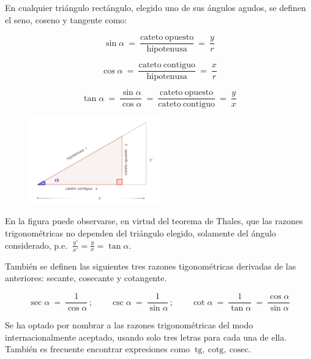 \begin{definition}

En cualquier triángulo rectángulo, elegido uno de sus ángulos agudos, se definen el seno, coseno y tangente como:

\begin{multicols}{2}

$$\sin \alpha \ = \ \dfrac{\mathrm{cateto \ opuesto}}{\mathrm{hipotenusa}} \ = \ \dfrac y r$$

$$\cos \alpha \ = \ \dfrac{\mathrm{cateto \ contiguo}}{\mathrm{hipotenusa}} \ = \ \dfrac x r$$

$$\tan \alpha \ = \ \dfrac{\sin \alpha}{\cos \alpha} \  =\ \dfrac{\mathrm{cateto \ opuesto}}{\mathrm{cateto \ contiguo}} \ = \ \dfrac y x$$

	\begin{figure}[H]
	\centering
	\includegraphics[width=0.5\textwidth]{img-rt/rt05.png}
\end{figure}
\end{multicols}

\end{definition}


En la figura puede observarse, en virtud del teorema de Thales, que las razones trigonométricas no dependen del triángulo elegido, solamente del ángulo considerado, p.e. $\ \frac {y'}{x'}=\frac y x =\tan \alpha$. 


\vspace{2mm} También se definen las siguientes tres razones tigonométricas derivadas de las anteriores: secante, cosecante y cotangente.


$$\sec \alpha \ = \ \dfrac 1{\cos \alpha}\, ; \qquad \csc \alpha \ = \ \dfrac 1 {\sin \alpha} \, ; \qquad \cot \alpha \ = \ \dfrac 1 {\tan \alpha} \ = \ \dfrac{\cos \alpha}{\sin \alpha}$$


\vspace{2mm} \textcolor{gris}{Se ha optado por nombrar a las razones trigonométricas del modo internacionalmente aceptado, usando solo tres letras para cada una de ella. También es frecuente encontrar expresiones como $\ \mathrm{tg,\ cotg,\ cosec}$}.

